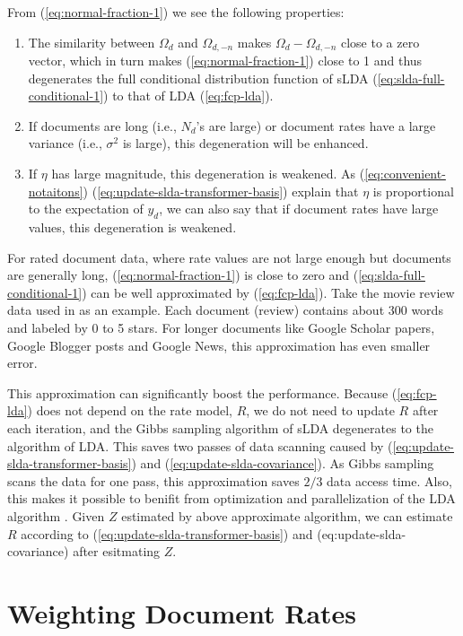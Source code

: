 From (\ref{eq:normal-fraction-1}) we see the following properties:
\begin{enumerate}
\item The similarity between $\Omega_d$ and $\Omega_{d,-n}$ makes
  $\Omega_d-\Omega_{d,-n}$ close to a zero vector, which in turn makes
  (\ref{eq:normal-fraction-1}) close to 1 and thus degenerates the
  full conditional distribution function of sLDA
  (\ref{eq:slda-full-conditional-1}) to that of LDA
  (\ref{eq:fcp-lda}).
\item If documents are long (i.e., $N_d$'s are large) or document
  rates have a large variance (i.e., $\sigma^2$ is large), this
  degeneration will be enhanced.
\item If $\eta$ has large magnitude, this degeneration is weakened.
  As (\ref{eq:convenient-notaitons})
  (\ref{eq:update-slda-transformer-basis}) explain that $\eta$ is
  proportional to the expectation of $y_d$, we can also say that if
  document rates have large values, this degeneration is weakened.
\end{enumerate}

For rated document data, where rate values are not large enough but
documents are generally long, (\ref{eq:normal-fraction-1}) is close to
zero and (\ref{eq:slda-full-conditional-1}) can be well approximated
by (\ref{eq:fcp-lda}).  Take the movie review data used in \cite{slda}
as an example. Each document (review) contains about 300 words and
labeled by 0 to 5 stars.   For longer
documents like Google Scholar papers, Google Blogger posts and Google
News, this approximation has even smaller error.

This approximation can significantly boost the performance.  Because
(\ref{eq:fcp-lda}) does not depend on the rate model, $R$, we do not
need to update $R$ after each iteration, and the Gibbs sampling
algorithm of sLDA degenerates to the algorithm of LDA.  This saves two
passes of data scanning caused by
(\ref{eq:update-slda-transformer-basis}) and
(\ref{eq:update-slda-covariance}).  As Gibbs sampling scans the data
for one pass, this approximation saves $2/3$ data access time.  Also,
this makes it possible to benifit from optimization and
parallelization of the LDA algorithm \cite{fastlda}
\cite{dist-lda-gibbs} \cite{async-dist-lda-gibbs}.  Given $Z$
estimated by above approximate algorithm, we can estimate $R$
according to (\ref{eq:update-slda-transformer-basis}) and
({eq:update-slda-covariance}) after esitmating $Z$.

\section{Weighting Document Rates}


